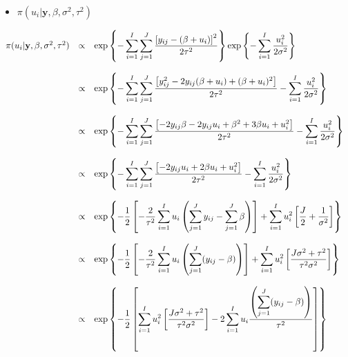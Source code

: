\documentclass{article}
\begin{document}
\begin{itemize}
\item $\pi(u_i|\textbf{y}, \beta, \sigma^2,\tau^2)$
\end{itemize}
\begin{equation*}
\begin{array}{lcl ll }
\pi(u_i|\textbf{y}, \beta, \sigma^2,\tau^2) & \propto &  \mbox{exp}\left\{ - \displaystyle\sum_{i=1}^{I}\sum_{j=1}^{J}\frac{\left[ y_{ij} - (\beta + u_i) \right]^2}{2\tau^2} \right\} \mbox{exp}\left\{ - \displaystyle\sum_{i=1}^{I} \dfrac{u_i^2}{2\sigma^2} \right\} \\\\

& \propto &  \mbox{exp}\left\{ - \displaystyle\sum_{i=1}^{I}\sum_{j=1}^{J}\frac{\left[ y_{ij}^2 - 2y_{ij}(\beta + u_i) + (\beta + u_i)^2 \right]}{2\tau^2}  - \displaystyle\sum_{i=1}^{I} \dfrac{u_i^2}{2\sigma^2} \right\} \\\\

& \propto &  \mbox{exp}\left\{ - \displaystyle\sum_{i=1}^{I}\sum_{j=1}^{J}\frac{\left[ - 2y_{ij}\beta -2y_{ij}u_i + \beta^2 + 3\beta u_i + u_i^2 \right]}{2\tau^2}  - \displaystyle\sum_{i=1}^{I} \dfrac{u_i^2}{2\sigma^2} \right\} \\\\

& \propto &  \mbox{exp}\left\{ - \displaystyle\sum_{i=1}^{I}\sum_{j=1}^{J}\frac{\left[ - 2y_{ij}u_i + 2\beta u_i + u_i^2 \right]}{2\tau^2}  - \displaystyle\sum_{i=1}^{I} \dfrac{u_i^2}{2\sigma^2} \right\} \\\\

& \propto &  \mbox{exp}\left\{ -\dfrac{1}{2}\left[ - \dfrac{2}{\tau^2}\displaystyle\sum_{i=1}^{I}u_i\left(\displaystyle\sum_{j=1}^{J} y_{ij} - \displaystyle\sum_{j=1}^{J}\beta\right)\right] + \displaystyle\sum_{i=1}^{I}u_i^2 \left[ \dfrac{J}{2} + \dfrac{1}{\sigma^2} \right]\right\} \\\\

& \propto &  \mbox{exp}\left\{ -\dfrac{1}{2}\left[ - \dfrac{2}{\tau^2}\displaystyle\sum_{i=1}^{I}u_i\left(\displaystyle\sum_{j=1}^{J} (y_{ij} - \beta)\right)\right] + \displaystyle\sum_{i=1}^{I}u_i^2 \left[ \dfrac{J\sigma^2 + \tau^2}{\tau^2\sigma^2} \right]\right\} \\\\

& \propto &  \mbox{exp}\left\{ -\dfrac{1}{2}\left[ \displaystyle\sum_{i=1}^{I}u_i^2 \left[ \dfrac{J\sigma^2 + \tau^2}{\tau^2\sigma^2}\right] - 2\displaystyle\sum_{i=1}^{I}u_i\frac{\left(\displaystyle\sum_{j=1}^{J} (y_{ij} - \beta)\right)}{\tau^2}  \right]\right\} \\\\

 \end{array}
\end{equation*}
\end{document}
